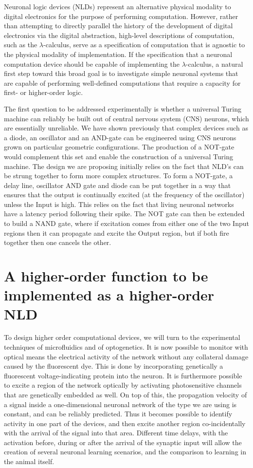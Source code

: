 Neuronal logic devices (NLDs) represent an alternative physical modality
to digital electronics for the purpose of performing computation.
However, rather than attempting to directly parallel the history of the
development of digital electronics via the digital abstraction,
high-level descriptions of computation, such as the
$\lambda$-calculus, serve as a specification
of computation that is agnostic to the physical modality of
implementation. If the specification that a neuronal computation device
should be capable of implementing the
$\lambda$-calculus, a natural first step
toward this broad goal is to investigate simple neuronal systems that
are capable of performing well-defined computations that require a
capacity for first- or higher-order logic.

The first question to be addressed experimentally is whether a universal Turing machine can reliably be built out of central nervous system (CNS) neurons, which are essentially unreliable. We have shown previously that complex devices such as a diode, an oscillator and an AND-gate can be engineered using CNS neurons grown on particular geometric configurations. The production of a NOT-gate would complement this set and enable the construction of a universal Turing machine.
The design we are proposing initially relies on the fact that NLD's can be strung together to form more complex structures. To form a NOT-gate, a delay line, oscillator AND gate and diode can be put together in a way that ensures that the output is continually excited (at the frequency of the oscillator) unless the Input is high. This relies on the fact that living neuronal networks have a latency period following their spike. The NOT gate can then be extended to build a NAND gate, where if excitation comes from either one of the two Input regions then it can propagate and excite the Output region, but if both fire together then one cancels the other.


\section{A higher-order function to be implemented as a higher-order
NLD}

To design higher order computational devices, we will turn to the experimental techniques of microfluidics and of optogenetics. 
It is now possible to monitor with optical means the electrical activity of the network without any collateral damage caused by the fluorescent dye. This is done by incorporating genetically a fluorescent voltage-indicating protein into the neuron. It is furthermore possible to excite a region of the network optically by activating photosensitive channels that are genetically embedded as well. On top of this, the propagation velocity of a signal inside a one-dimensional neuronal network of the type we are using is constant, and can be reliably predicted. Thus it becomes possible to identify activity in one part of the devices, and then excite another region co-incidentally with the arrival of the signal into that area. Different time delays, with the activation before, during or after the arrival of the synaptic input will allow the creation of several neuronal learning scenarios, and the comparison to learning in the animal itself.


